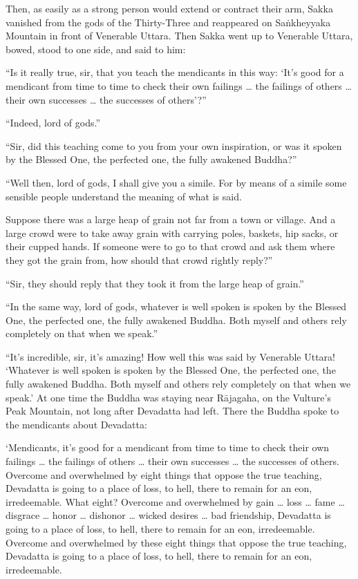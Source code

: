 \documentclass[12pt,openany]{book}%
\begin{document}
Then, as easily as a strong person would extend or contract their arm, Sakka vanished from the gods of the Thirty-Three and reappeared on \textsanskrit{Saṅkheyyaka} Mountain in front of Venerable Uttara. Then Sakka went up to Venerable Uttara, bowed, stood to one side, and said to him: 

“Is it really true, sir, that you teach the mendicants in this way: ‘It’s good for a mendicant from time to time to check their own failings … the failings of others … their own successes … the successes of others’?” 

“Indeed, lord of gods.” 

“Sir, did this teaching come to you from your own inspiration, or was it spoken by the Blessed One, the perfected one, the fully awakened Buddha?” 

“Well then, lord of gods, I shall give you a simile. For by means of a simile some sensible people understand the meaning of what is said. 

Suppose there was a large heap of grain not far from a town or village. And a large crowd were to take away grain with carrying poles, baskets, hip sacks, or their cupped hands. If someone were to go to that crowd and ask them where they got the grain from, how should that crowd rightly reply?” 

“Sir, they should reply that they took it from the large heap of grain.” 

“In the same way, lord of gods, whatever is well spoken is spoken by the Blessed One, the perfected one, the fully awakened Buddha. Both myself and others rely completely on that when we speak.” 

“It’s incredible, sir, it’s amazing! How well this was said by Venerable Uttara! ‘Whatever is well spoken is spoken by the Blessed One, the perfected one, the fully awakened Buddha. Both myself and others rely completely on that when we speak.’ At one time the Buddha was staying near \textsanskrit{Rājagaha}, on the Vulture’s Peak Mountain, not long after Devadatta had left. There the Buddha spoke to the mendicants about Devadatta: 

‘Mendicants, it’s good for a mendicant from time to time to check their own failings … the failings of others … their own successes … the successes of others. Overcome and overwhelmed by eight things that oppose the true teaching, Devadatta is going to a place of loss, to hell, there to remain for an eon, irredeemable. What eight? Overcome and overwhelmed by gain … loss … fame … disgrace … honor … dishonor … wicked desires … bad friendship, Devadatta is going to a place of loss, to hell, there to remain for an eon, irredeemable. Overcome and overwhelmed by these eight things that oppose the true teaching, Devadatta is going to a place of loss, to hell, there to remain for an eon, irredeemable. 
\end{document}
